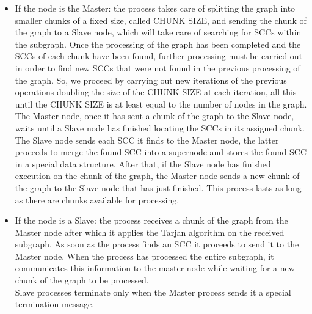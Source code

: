 \begin{itemize}
    \item If the node is the Master: the process takes care of splitting the graph into smaller chunks of a fixed size, called CHUNK SIZE, and sending the chunk of the graph to a Slave node, which will take care of searching for SCCs within the subgraph. 
    Once the processing of the graph has been completed and the SCCs of each chunk have been found, further processing must be carried out in order to find new SCCs that were not found in the previous processing of the graph. So, we proceed by carrying out new iterations of the previous operations doubling the size of the CHUNK SIZE at each iteration, all this until the CHUNK SIZE is at least equal to the number of nodes in the graph. \\
    The Master node, once it has sent a chunk of the graph to the Slave node, waits until a Slave node has finished locating the SCCs in its assigned chunk. The Slave node sends each SCC it finds to the Master node, the latter proceeds to merge the found SCC into a supernode and stores the found SCC in a special data structure. After that, if the Slave node has finished execution on the chunk of the graph, the Master node sends a new chunk of the graph to the Slave node that has just finished. This process lasts as long as there are chunks available for processing.       
    \item If the node is a Slave: the process receives a chunk of the graph from the Master node after which it applies the Tarjan algorithm on the received subgraph. As soon as the process finds an SCC it proceeds to send it to the Master node. When the process has processed the entire subgraph, it communicates this information to the master node while waiting for a new chunk of the graph to be processed. \\
    Slave processes terminate only when the Master process sends it a special termination message.
\end{itemize} 
